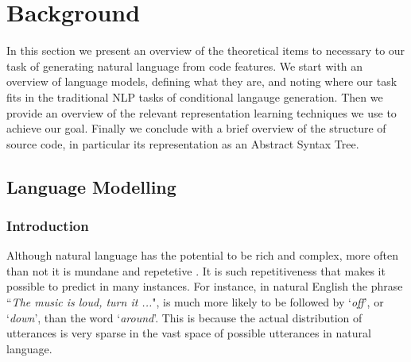 \chapter{Background}
\label{background}

In this section we present an overview of the theoretical items to necessary to our task of generating natural language from code features.
We start with an overview of language models, defining what they are, and noting where our task fits in the traditional NLP tasks of conditional langauge generation.
Then we provide an overview of the relevant representation learning techniques we use to achieve our goal.
Finally we conclude with a brief overview of the structure of source code, in particular its representation as an Abstract Syntax Tree. 


\section{Language Modelling} %
\label{sec:lstm}

\subsection{Introduction} %
\label{sub:recurrent_neural_networks}

Although natural language has the potential to be rich and complex, more often than not it is mundane and repetetive \cite{hindle_naturalness_nodate}. 
It is such repetitiveness that makes it possible to predict in many instances. For instance, in natural English the phrase ``\textit{The music is loud, turn it ...}", is much more likely to be followed by `\textit{off}', or `\textit{down}', than the word `\textit{around}'.
This is because the actual distribution of utterances is very sparse in  the vast space of possible utterances in natural language.

